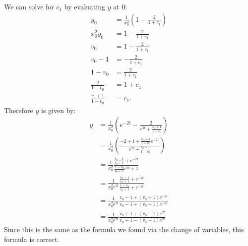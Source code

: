 \documentclass[12pt, letterpaper]{article}
\begin{document}
\begin{enumerate}
\begin{enumerate}
			We can solve for $c_1$ by evaluating $y$ at $0$:
			\begin{align*}
				y_0 &= \frac{1}{x_0^2} \left( 1 - \frac{2}{1+c_1}\right)\\
				x_0^2 y_0 &= 1 - \frac{2}{1+c_1}\\
				v_0 &= 1 - \frac{2}{1+c_1}\\
				v_0 -1 &= - \frac{2}{1+c_1}\\
				1-v_0 &= \frac{2}{1+c_1}\\
				\frac{2}{1-v_0} &= 1+c_1\\
				\frac{v_0 +1}{1-v_0} &= c_1.
			\end{align*}
			Therefore $y$ is given by:
			\begin{align*}
				y &= \frac{1}{x_0^2}\left( e^{-2t} - \frac{2}{e^{2t} + 	\frac{v_0 +1}{1-v_0}} \right)\\
				  &= \frac{1}{x_0^2}\left( \frac{-2 + 1 + \frac{v_0 +1}{1-v_0}e^{-2t}}{e^{2t} + 	\frac{v_0 +1}{1-v_0}}\right)\\
				  &= \frac{1}{x_0^2} \frac{\frac{v_0-1}{v_0 +1} + e^{-2t}}{\frac{1-v_0}{v_0 +1}e^{2t} + 1}\\
				  &= \frac{1}{x_0^2e^{2t}}\frac{\frac{v_0-1}{v_0 +1} + e^{-2t}}{\frac{1-v_0}{v_0 +1} + e^{-2t}}\\
				  &= \frac{1}{x_0^2e^{2t}}\frac{v_0 -1 + (v_0 + 1)e^{-2t}}{v_0 -1 + (v_0 + 1)e^{-2t}}\\
				  &= \frac{1}{x_0^2e^{2t}}\frac{v_0+1+(v_0-1)e^{2t}}{v_0+1-(v_0-1)e^{2t}}			
			\end{align*}
			Since this is the same as the formula we found via the change of variables, this formula is correct.  

			
	\end{enumerate}
\end{enumerate}
\end{document}
